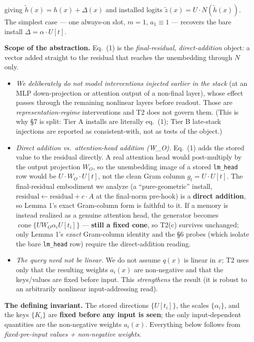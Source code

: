 \documentclass[11pt]{article}
\theoremstyle{plain}
\theoremstyle{definition}
\begin{document}
giving $\tilde h(x) = h(x) + \Delta(x)$ and installed logits $\tilde z(x) = U \cdot N(\tilde h(x))$. The simplest case --- one always-on slot, $m = 1$, $a_1 \equiv 1$ --- recovers the bare install $\Delta = \alpha \cdot U[t]$.

\textbf{Scope of the abstraction.} Eq.~(1) is the \emph{final-residual, direct-addition} object: a vector added straight to the residual that reaches the unembedding through $N$ only.

\begin{itemize}
\item \emph{We deliberately do not model interventions injected earlier in the stack} (at an MLP down-projection or attention output of a non-final layer), whose effect passes through the remaining nonlinear layers before readout. Those are \emph{representation-regime} interventions and T2 does not govern them. (This is why \S 7 is split: Tier A installs are literally eq.~(1); Tier B late-stack injections are reported as consistent-with, not as tests of the object.)
\item \emph{Direct addition vs.\ attention-head addition (W\_O).} Eq.~(1) adds the stored value to the residual directly. A real attention head would post-multiply by the output projection $W_O$, so the unembedding image of a stored \texttt{lm\_head} row would be $U \cdot W_O \cdot U[t]$, not the clean Gram column $g_t = U \cdot U[t]$. The final-residual embodiment we analyze (a ``pure-geometric'' install, $\text{residual} \leftarrow \text{residual} + c \cdot A$ at the final-norm pre-hook) is a \textbf{direct addition}, so Lemma 1's exact Gram-column form is faithful to it. If a memory is instead realized as a genuine attention head, the generator becomes $\operatorname{cone}\{U W_O \alpha_i U[t_i]\}$ --- \textbf{still a fixed cone}, so T2(c) survives unchanged; only Lemma 1's \emph{exact} Gram-column identity and the \S 6 probes (which isolate the bare \texttt{lm\_head} row) require the direct-addition reading.
\item \emph{The query need not be linear.} We do not assume $q(x)$ is linear in $x$; T2 uses only that the resulting weights $a_i(x)$ are non-negative and that the keys/values are fixed before input. This \emph{strengthens} the result (it is robust to an arbitrarily nonlinear input-addressing read).
\end{itemize}

\textbf{The defining invariant.} The stored directions $\{U[t_i]\}$, the scales $\{\alpha_i\}$, and the keys $\{K_i\}$ are \textbf{fixed before any input is seen}; the only input-dependent quantities are the non-negative weights $a_i(x)$. Everything below follows from \emph{fixed-pre-input values + non-negative weights}.
\end{document}
